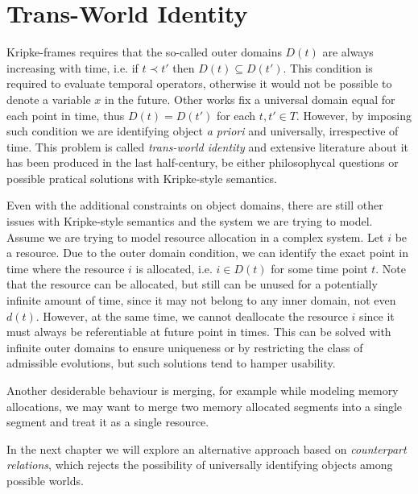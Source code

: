 \section{Trans-World Identity}

Kripke-frames requires that the so-called outer domains $D(t)$ are always increasing with time, i.e. if $t \prec t'$
then $D(t) \subseteq D(t')$. This condition is required to evaluate temporal operators, otherwise it would not be
possible to denote a variable $x$ in the future. Other works fix a universal domain equal for each point in time, thus
$D(t) = D(t')$ for each $t, t' \in T$.  However, by imposing such condition we are identifying object \emph{a priori}
and universally, irrespective of time. This problem is called \emph{trans-world identity} and extensive literature about
it has been produced in the last half-century, be either philosophycal questions or possible pratical solutions with
Kripke-style semantics.

Even with the additional constraints on object domains, there are still other issues with Kripke-style semantics and the
system we are trying to model. Assume we are trying to model resource allocation in a complex system. Let $i$ be a
resource. Due to the outer domain condition, we can identify the exact point in time where the resource $i$ is
allocated, i.e. $i \in D(t)$ for some time point $t$. Note that the resource can be allocated, but still can be unused
for a potentially infinite amount of time, since it may not belong to any inner domain, not even $d(t)$. However, at the
same time, we cannot deallocate the resource $i$ since it must always be referentiable at future point in times. This
can be solved with infinite outer domains to ensure uniqueness or by restricting the class of admissible evolutions, but
such solutions tend to hamper usability.

Another desiderable behaviour is merging, for example while modeling memory allocations, we may want to merge two memory
allocated segments into a single segment and treat it as a single resource.

In the next chapter we will explore an alternative approach based on \emph{counterpart relations}, which rejects the
possibility of universally identifying objects among possible worlds.
